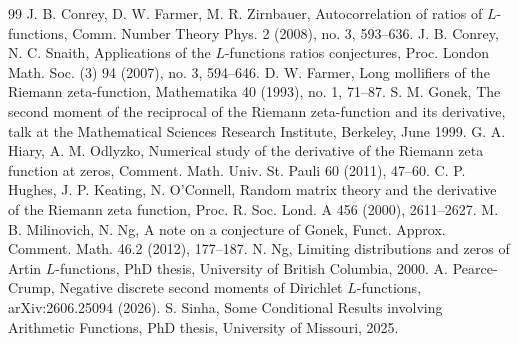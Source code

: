 \documentclass[11pt]{amsart}
\begin{document}
\begin{thebibliography}{99}
 J. B. Conrey, D. W. Farmer, M. R. Zirnbauer, Autocorrelation of ratios of $L$-functions, Comm. Number
Theory Phys. 2 (2008), no. 3, 593--636.
 J. B. Conrey, N. C. Snaith, Applications of the $L$-functions ratios conjectures, Proc. London Math.
Soc. (3) 94 (2007), no. 3, 594--646.
 D. W. Farmer, Long mollifiers of the Riemann zeta-function, Mathematika 40 (1993), no. 1, 71--87.
 S. M. Gonek, The second moment of the reciprocal of the Riemann zeta-function and its derivative, talk
at the Mathematical Sciences Research Institute, Berkeley, June 1999.
 G. A. Hiary, A. M. Odlyzko, Numerical study of the derivative of the Riemann zeta function at zeros,
Comment. Math. Univ. St. Pauli 60 (2011), 47--60.
 C. P. Hughes, J. P. Keating, N. O'Connell, Random matrix theory and the derivative of the Riemann zeta
function, Proc. R. Soc. Lond. A 456 (2000), 2611--2627.
 M. B. Milinovich, N. Ng, A note on a conjecture of Gonek, Funct. Approx. Comment. Math. 46.2 (2012),
177--187.
 N. Ng, Limiting distributions and zeros of Artin $L$-functions, PhD thesis, University of British Columbia,
2000.
 A. Pearce-Crump, Negative discrete second moments of Dirichlet $L$-functions, arXiv:2606.25094 (2026).
 S. Sinha, Some Conditional Results involving Arithmetic Functions, PhD thesis, University of Missouri,
2025.
\end{thebibliography}
\end{document}
